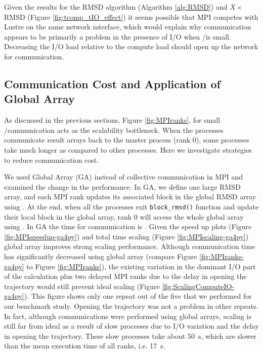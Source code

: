 Given the results for the RMSD algorithm (Algorithm \ref{alg:RMSD}) and $X\times$ RMSD (Figure \ref{fig:tcomp_tIO_effect})
it seems possible that MPI competes with Lustre on the same network interface, which would explain why communication appears to
be primarily a problem in the presence of I/O when \tcomp/\tIO is small.
Decreasing the I/O load relative to the compute load should open up the network for communication. 

\subsection{Communication Cost and Application of Global Array}
\label{Global-Array}
As discussed in the previous sections, Figure \ref{fig:MPIranks}, for small \tcomp/\tIO communication acts as the scalability bottleneck. 
When the processes communicate result arrays back to the master process (rank 0), some processes take much longer as compared to other processes. 
Here we investigate strategies to reduce communication cost. 

We used Global Array (GA) \cite{GA, GAiN} instead of collective communication in MPI and examined the change in the performance. 
In GA, we define one large RMSD array, and each MPI rank updates its associated block in the global RMSD array using . 
At the end, when all the processes exit \texttt{block\_rmsd()} function and update their local block in the global array, rank 0 will access the whole global array using .
In GA the time for communication is .
Given the speed up plots (Figure \ref{fig:MPIspeedup-ga4py}) and total time scaling (Figure \ref{fig:MPIscaling-ga4py}) global array improves strong scaling performance.
Although communication time has significantly decreased using global array (compare Figure \ref{fig:MPIranks-ga4py} to Figure \ref{fig:MPIranks}),
the existing variation in the dominant I/O part of the calculation plus two delayed MPI ranks due to the delay in opening the trajectory would still prevent ideal scaling (Figure \ref{fig:ScalingComputeIO-ga4py}).
This figure shows only one repeat out of the five that we performed for our benchmark study. 
Opening the trajectory was not a problem in other repeats.
In fact, although communications were performed using global arrays, scaling is still far from ideal as a result of slow processes due to I/O variation and the delay in opening the trajectory.
These slow processes take about 50~s, which are slower than the mean execution time of all ranks, i.e. 17~s. 

